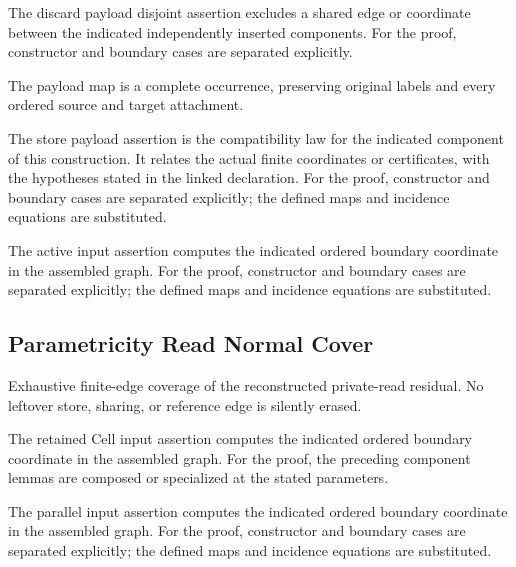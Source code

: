 The discard payload disjoint assertion excludes a shared edge or coordinate between the indicated independently inserted components.
For the proof, constructor and boundary cases are separated explicitly.
\par{}

The payload map is a complete occurrence, preserving original labels and every ordered source and target attachment.
\par{}

The store payload assertion is the compatibility law for the indicated component of this construction. It relates the actual finite coordinates or certificates, with the hypotheses stated in the linked declaration.
For the proof, constructor and boundary cases are separated explicitly; the defined maps and incidence equations are substituted.
\par{}

The active input assertion computes the indicated ordered boundary coordinate in the assembled graph.
For the proof, constructor and boundary cases are separated explicitly; the defined maps and incidence equations are substituted.
\par{}

\subsection{Parametricity Read Normal Cover}
Exhaustive finite-edge coverage of the reconstructed private-read residual. No leftover store, sharing, or reference edge is silently erased.

The retained Cell input assertion computes the indicated ordered boundary coordinate in the assembled graph.
For the proof, the preceding component lemmas are composed or specialized at the stated parameters.
\par{}

The parallel input assertion computes the indicated ordered boundary coordinate in the assembled graph.
For the proof, constructor and boundary cases are separated explicitly; the defined maps and incidence equations are substituted.
\par{}

